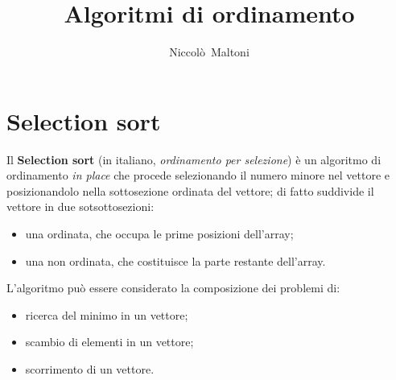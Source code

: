 \onehalfspacing{}             %

\setcounter{secnumdepth}{3}   %
\setcounter{tocdepth}{3}      %

\usepackage[%
  depth=3,            %
  open=false,         %
  numbered=true       %
]{bookmark}                   %
\usepackage{hyperref}         %

\usepackage[a-1b]{pdfx}
\usepackage[%
  italian,            %
  nameinlink          %
]{cleveref}                   %

\title{\LARGE{\textbf{Algoritmi di ordinamento}}}

\author{Niccolò~Maltoni}

\date{}



  \maketitle
  \clearpage

  \section{Selection sort}

  Il \textbf{Selection sort} (in italiano, \textit{ordinamento per selezione})
  è un algoritmo di ordinamento \textit{in place} che procede selezionando il numero minore nel vettore
  e posizionandolo nella sottosezione ordinata del vettore;
  di fatto suddivide il vettore in due sotsottosezioni:

  \begin{itemize}
    \item una ordinata, che occupa le prime posizioni dell'array;
    \item una non ordinata, che costituisce la parte restante dell'array.
  \end{itemize}

  \noindent{} L'algoritmo può essere considerato la composizione dei problemi di:

  \begin{itemize}
    \item ricerca del minimo in un vettore;
    \item scambio di elementi in un vettore;
    \item scorrimento di un vettore.
  \end{itemize}

  \inputminted{cpp}{./src/selection.cpp}



